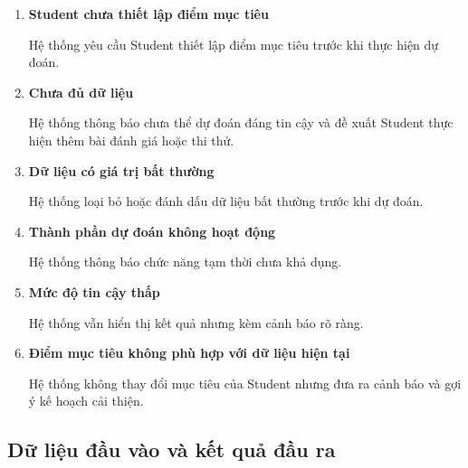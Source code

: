 \begin{enumerate}[label=\textbf{A\arabic*.}]
	\item \textbf{Student chưa thiết lập điểm mục tiêu}
	
	Hệ thống yêu cầu Student thiết lập điểm mục tiêu trước khi thực hiện
	dự đoán.
	
	\item \textbf{Chưa đủ dữ liệu}
	
	Hệ thống thông báo chưa thể dự đoán đáng tin cậy và đề xuất Student
	thực hiện thêm bài đánh giá hoặc thi thử.
	
	\item \textbf{Dữ liệu có giá trị bất thường}
	
	Hệ thống loại bỏ hoặc đánh dấu dữ liệu bất thường trước khi dự đoán.
	
	\item \textbf{Thành phần dự đoán không hoạt động}
	
	Hệ thống thông báo chức năng tạm thời chưa khả dụng.
	
	\item \textbf{Mức độ tin cậy thấp}
	
	Hệ thống vẫn hiển thị kết quả nhưng kèm cảnh báo rõ ràng.
	
	\item \textbf{Điểm mục tiêu không phù hợp với dữ liệu hiện tại}
	
	Hệ thống không thay đổi mục tiêu của Student nhưng đưa ra cảnh báo và
	gợi ý kế hoạch cải thiện.
\end{enumerate}

\subsection{Dữ liệu đầu vào và kết quả đầu ra}

